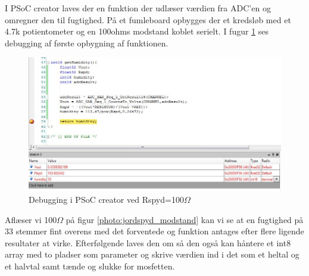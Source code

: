 I PSoC creator laves der en funktion der udlæser værdien fra ADC'en og omregner den til fugtighed. På et fumleboard opbygges der et kredsløb med et 4.7k potientometer og en 100ohms modstand koblet serielt. I fugur \ref{photo:debug100} ses debugging af første opbygning af funktionen.

\begin{figure}[H]
	\centering 
	\includegraphics[scale=0.8]{HardwareArkitektur/Sensore/Jordfugt_billeder/debug100ohm.jpg}
	\caption{Debugging i PSoC creator ved Rspyd=100$\Omega$}
	\label{photo:debug100}
\end{figure} 

Aflæser vi 100$\Omega$ på figur \ref{photo:jordspyd_modstand} kan vi se at en fugtighed på 33 stemmer fint overens med det forventede og funktion antages efter flere ligende resultater at virke. Efterfølgende laves den om så den også kan håntere et int8 array med to pladser som parameter og skrive værdien ind i det som et heltal og et halvtal samt tænde og slukke for mosfetten. 






   


